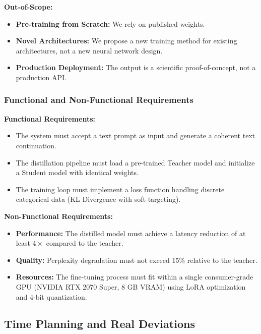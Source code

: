 \documentclass[11pt, a4paper]{article}
\begin{document}
\textbf{Out-of-Scope:}
\begin{itemize}
    \item \textbf{Pre-training from Scratch:} We rely on published weights.
    \item \textbf{Novel Architectures:} We propose a new training method for existing architectures, not a new neural network design.
    \item \textbf{Production Deployment:} The output is a scientific proof-of-concept, not a production API.
\end{itemize}

\subsubsection*{Functional and Non-Functional Requirements}
\textbf{Functional Requirements:}
\begin{itemize}
    \item The system must accept a text prompt as input and generate a coherent text continuation.
    \item The distillation pipeline must load a pre-trained Teacher model and initialize a Student model with identical weights.
    \item The training loop must implement a loss function handling discrete categorical data (KL Divergence with soft-targeting).
\end{itemize}

\textbf{Non-Functional Requirements:}
\begin{itemize}
    \item \textbf{Performance:} The distilled model must achieve a latency reduction of at least $4\times$ compared to the teacher.
    \item \textbf{Quality:} Perplexity degradation must not exceed 15\% relative to the teacher.
    \item \textbf{Resources:} The fine-tuning process must fit within a single consumer-grade GPU (NVIDIA RTX 2070 Super, 8 GB VRAM) using LoRA optimization and 4-bit quantization.
\end{itemize}

\subsection*{Time Planning and Real Deviations}
\label{subsec:time_planning}
\end{document}
